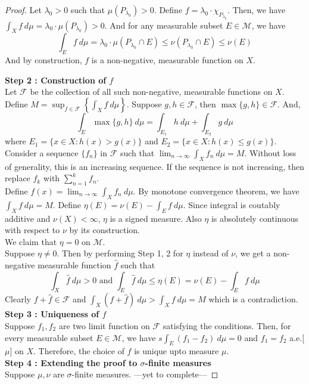 \begin{proof}
	Let $\lambda_0 >0$ such that $\mu(P_{\lambda_0}) > 0$.
	Define $f = \lambda_0 \cdot \chi_{P_{\lambda_0}}$.
	Then, we have $\displaystyle \int_X f \ d\mu = \lambda_0 \cdot \mu(P_{\lambda_0}) > 0$.
	And for any measurable subset $E \in \mathcal{M}$, we have
	$$\int_E f \ d\mu = \lambda_0 \cdot \mu(P_{\lambda_0} \cap E) \le \nu(P_{\lambda_0} \cap E) \le \nu(E)$$
	And by construction, $f$ is a non-negative, measurable function on $X$.

	\textbf{Step 2 : Construction of $f$}\\
	Let $\mathcal{F}$ be the collection of all such non-negative, measurable functions on $X$.
	Define $\displaystyle M = \sup_{f \in \mathcal{F}} \left\{ \int_X f \ d\mu \right\}$.
	Suppose $g,h \in \mathcal{F}$, then $\max\{g,h\} \in \mathcal{F}$.
	And,
	$$\int_E \max \{g,h\} \ d\mu = \int_{E_1} h \ d\mu + \int_{E_2} g \ d\mu$$
	where $E_1 = \{ x \in X : h(x) > g(x) \}$ and $E_2 = \{ x \in X : h(x) \le g(x) \}$.\\

	Consider a sequence $\{f_n\}$ in $\mathcal{F}$ such that $\displaystyle \lim_{n \to \infty} \int_X f_n \ d\mu = M$.
	Without loss of generality, this is an increasing sequence.
	If the sequence is not increasing, then replace $f_k$ with $\displaystyle \sum_{n=1}^k f_n$.\\

	Define $\displaystyle f(x) = \lim_{n \to \infty} \int_X f_n \ d\mu$.
	By monotone convergence theorem,  we have $\int_X f \ d\mu = M$.
	Define $\eta(E) = \nu(E) - \int_E f \ d\mu$.
	Since integral is coutably additive and $\nu(X) < \infty$, $\eta$ is a signed measure.
	Also $\eta$ is absolutely continuous with respect to $\nu$ by its construction.\\

	We claim that $\eta = 0$ on $\mathcal{M}$.\\
	Suppose $\eta \ne 0$.
	Then by performing Step 1, 2 for $\eta$ instead of $\nu$, we get a non-negative measurable function $\hat{f}$ such that
	$$ \int_X \hat{f} \ d\mu > 0 \text{ and } \int_E \hat{f} \ d\mu \le \eta(E) = \nu(E) - \int_E f \ d\mu $$
	Clearly $f + \hat{f} \in \mathcal{F}$ and $\displaystyle \int_X (f+\hat{f}) \ d\mu > \int_X f \ d\mu = M$ which is a contradiction.\\

	\textbf{Step 3 : Uniqueness of $f$}\\
	Suppose $f_1,f_2$ are two limit function on $\mathcal{F}$ satisfying the conditions.
	Then, for every measurable subset $E \in \mathcal{M}$, we have $\displaystyle s\int_E (f_1-f_2) \ d\mu = 0$ and $f_1 = f_2$ a.e.[$\mu$] on $X$.
	Therefore, the choice of $f$ is unique upto measure $\mu$.\\

	\textbf{Step 4 : Extending the proof to $\sigma$-finite measures}\\
	Suppose $\mu,\nu$ are $\sigma$-finite measures.
	---yet to complete---
\end{proof}

